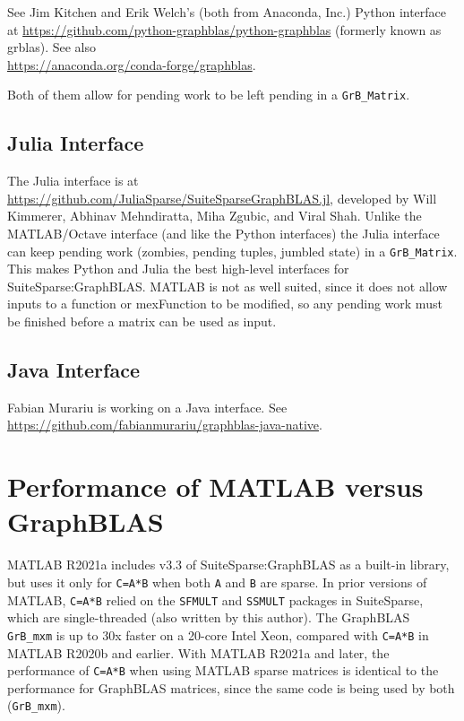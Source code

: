 \documentclass[12pt]{article}
\begin{document}
See Jim Kitchen and Erik Welch's (both from Anaconda, Inc.) Python interface at
\url{https://github.com/python-graphblas/python-graphblas} (formerly known as grblas).
See also \\
\url{https://anaconda.org/conda-forge/graphblas}.

Both of them allow for pending work to be left pending in a \verb'GrB_Matrix'.

\subsection{Julia Interface}
\label{julia}

The Julia interface is at
\url{https://github.com/JuliaSparse/SuiteSparseGraphBLAS.jl}, developed by Will
Kimmerer, Abhinav Mehndiratta, Miha Zgubic, and Viral Shah.  
Unlike the MATLAB/Octave interface (and like the Python interfaces) the Julia 
interface can keep pending work (zombies, pending tuples, jumbled state) in
a \verb'GrB_Matrix'. This makes Python and Julia the best high-level interfaces
for SuiteSparse:GraphBLAS.  MATLAB is not as well suited, since it does not
allow inputs to a function or mexFunction to be modified, so any pending
work must be finished before a matrix can be used as input.

\subsection{Java Interface}
\label{java}

Fabian Murariu is working on a Java interface.
See \newline
\url{https://github.com/fabianmurariu/graphblas-java-native}.

\section{Performance of MATLAB versus GraphBLAS}
\label{matlab_performance}

MATLAB R2021a includes v3.3 of SuiteSparse:GraphBLAS as a built-in library, but
uses it only for \verb'C=A*B' when both \verb'A' and \verb'B' are sparse.  In
prior versions of MATLAB, \verb'C=A*B' relied on the \verb'SFMULT' and
\verb'SSMULT' packages in SuiteSparse, which are single-threaded (also written
by this author).  The GraphBLAS \verb'GrB_mxm' is up to 30x faster on a 20-core
Intel Xeon, compared with \verb'C=A*B' in MATLAB R2020b and earlier.  With
MATLAB R2021a and later, the performance of \verb'C=A*B' when using MATLAB
sparse matrices is identical to the performance for GraphBLAS matrices, since
the same code is being used by both (\verb'GrB_mxm').
\end{document}
